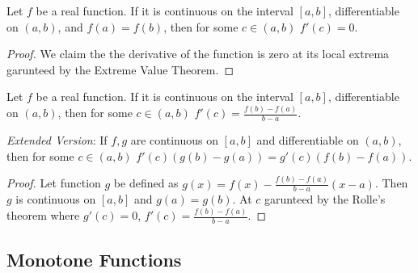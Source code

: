 \documentclass[../note.tex]{subfiles}
\begin{document}


\begin{theorem}
	Let $f$ be a real function. If it is continuous on the interval $[a,b]$, differentiable on $(a,b)$, and $f(a)=f(b)$, then for some $c \in (a,b)$ $f'(c)=0$.
\end{theorem}
\begin{proof}
	We claim the the derivative of the function is zero at its local extrema garunteed by the Extreme Value Theorem.
\end{proof}

\begin{theorem}
	Let $f$ be a real function. If it is continuous on the interval $[a,b]$, differentiable on $(a,b)$, then for some $c \in (a,b)$ $f'(c)=\frac{f(b)-f(a)}{b-a}$.

	\emph{Extended Version}: 
	If $f,g$ are continuous on $[a,b]$ and differentiable on $(a,b)$, then for some $c \in (a,b)$ $f'(c)(g(b)-g(a))=g'(c)(f(b)-f(a))$.
\end{theorem}

\begin{proof}
	Let function $g$ be defined as $g(x)=f(x)-\frac{f(b)-f(a)}{b-a}(x-a)$. Then $g$ is continuous on $[a,b]$ and $g(a)=g(b)$. At $c$ garunteed by the Rolle's theorem where $g'(c)=0$, $f'(c) = \frac{f(b)-f(a)}{b-a}$.
\end{proof}

\theorem[Bernoulli's Inequality]{
	Let $\alpha >0$ and $\delta l\geq -1$. Then 
	\begin{enumerate}
		\item $(1+\delta)^{\alpha} \leq 1+\delta\alpha$ if $\alpha \in (0,1]$,
		\item $(1+\delta)^{\alpha} \geq 1+\delta\alpha$ if $\alpha \in [1,\infty)$,
	\end{enumerate}
}

\subsection{Monotone Functions}
\end{document}
